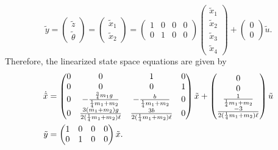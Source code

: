 \[
\tilde{y} = \begin{pmatrix} \tilde{z} \\ \tilde{\theta}\end{pmatrix} = \begin{pmatrix}\tilde{x}_1 \\ \tilde{x}_2\end{pmatrix} = \begin{pmatrix} 1 & 0 & 0 & 0 \\ 0 & 1 & 0 & 0\end{pmatrix}\begin{pmatrix}\tilde{x}_1 \\ \tilde{x}_2 \\\tilde{x}_3 \\ \tilde{x}_4 \end{pmatrix} + \begin{pmatrix} 0 \\ 0 \end{pmatrix}\tilde{u}.
\]
Therefore, the linearized state space equations are given by
\begin{align}
\dot{\tilde{x}} &= \begin{pmatrix} 0 & 0 & 1 & 0 \\ 0 & 0 & 0 & 1 \\ 0 & -\frac{\frac{3}{4} m_1g}{\frac{1}{4}m_1 + m_2} & -\frac{b}{\frac{1}{4}m_1 + m_2} & 0 \\ 0 & \frac{3 (m_1+m_2)g}{2 (\frac{1}{4}m_1 + m_2)\ell} & \frac{3b}{2(\frac{1}{4}m_1 + m_2)\ell} & 0 \end{pmatrix} \tilde{x} + \begin{pmatrix} 0 \\ 0 \\ \frac{1}{\frac{1}{4}m_1 + m_2} \\  \frac{-3}{2(\frac{1}{4}m_1 + m_2)\ell} \end{pmatrix} \tilde{u} 
\notag \\
\tilde{y} &= \begin{pmatrix} 1 & 0 & 0 & 0 \\ 0 & 1 & 0 & 0\end{pmatrix} \tilde{x}.
\label{eq:dm_pendulum_linearized_ss}
\end{align}

